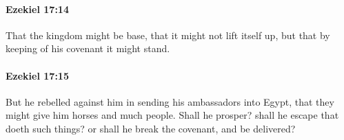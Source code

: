 		\paragraph{Ezekiel 17:14} %
			\label{EZEKIEL-17-14}

			That the kingdom might be base, that it might not lift itself up, but that by keeping of his covenant it might stand.


		\paragraph{Ezekiel 17:15} %
			\label{EZEKIEL-17-15}

			But he rebelled against him in sending his ambassadors into Egypt, that they might give him horses and much people. Shall he prosper? shall he escape that doeth such things? or shall he break the covenant, and be delivered?


